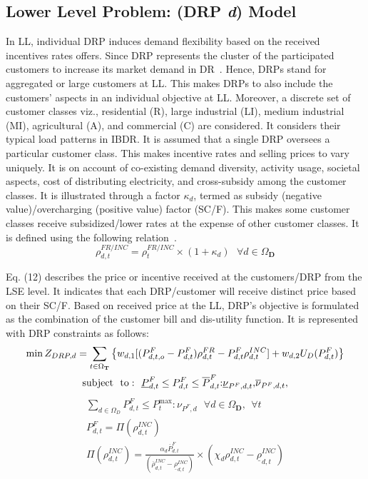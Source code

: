 \documentclass[journal]{IEEEtran}
\begin{document}
\vspace{-2mm}
\subsection{Lower Level Problem: (DRP \textit{d}) Model }
In LL, individual DRP induces demand flexibility based on the received incentives rates offers. Since DRP represents the cluster of the participated customers to increase its market demand in DR~\cite{li2016dynamic}. Hence, DRPs stand for aggregated or large customers at LL. This makes DRPs to also include the customers’ aspects in an individual objective at LL. Moreover, a discrete set of customer classes viz., residential (R), large industrial (LI), medium industrial (MI), agricultural (A), and commercial (C) are considered\mbox{\cite{pandey2021hierarchical}}. It considers their typical load patterns in IBDR. It is assumed that a single DRP oversees a particular customer class. This makes incentive rates and selling prices to vary uniquely. It is on account of co-existing demand diversity, activity usage, societal aspects, cost of distributing electricity, and cross-subsidy among the customer classes\mbox{\cite{faruqui2012ethics}}. It is illustrated through a factor \mbox{$\kappa_d$}, termed as subsidy (negative value)/overcharging (positive value) factor (SC/F). This makes some customer classes receive subsidized/lower rates at the expense of other customer classes. It is defined using the following relation~\cite{pandey2021hierarchical}. 
\begin{equation}
\rho _{d,t}^{FR/INC} = \rho _t^{FR/INC} \times (1 + {\kappa _d})~~~\forall d \in \Omega_\textbf{D}
\end{equation}

Eq. (12) describes the price or incentive received at the customers/DRP from the LSE level. It indicates that each DRP/customer will receive distinct price based on their SC/F. Based on received price at the LL, DRP's objective is formulated as the combination of the customer bill and dis-utility function. It is represented with DRP constraints as follows: 
\begin{gather}
\mathop {\min } {Z_{DRP,d}} = \sum\limits_{t \in {\Omega _\textbf{T}}} {\left\{ {{w_{d,1}}[(P_{d,t,o}^F - P_{d,t}^F)\rho _{d,t}^{FR} - P_{d,t}^F\rho _{d,t}^{INC}] + {w_{d,2}}{U_D}(P_{d,t}^F)} \right\}} \\
{\rm{subject ~~to:~~}}\underline P _{d,t}^F \le P_{d,t}^F \le \overline P _{d,t}^F{\rm{:}}{\underline \nu  _{{P^{F}},d,t}}{\rm{,}}{\overline \nu  _{{P^F},d,t}}{\rm{,   }}
\end{gather}
\begin{gather}
\sum\limits_{d \in {\Omega _D}} {P_{d,t}^F}  \le P_{t}^{\max }:{\nu _{{P^F},d}}~~~\forall d \in \Omega_\textbf{D},~~\forall t\\
P_{d,t}^F = \Pi (\rho _{d,t}^{INC})\\
\Pi (\rho _{d,t}^{INC}) = \frac{{{\alpha _d}\overline P _{d,t}^F}}{{(\overline \rho  _{d,t}^{INC} - \underline \rho  _{d,t}^{INC})}} \times \left( {{\chi _d}\rho _{d,t}^{INC} - \underline \rho  _{d,t}^{INC}} \right)
\end{gather}
\end{document}
